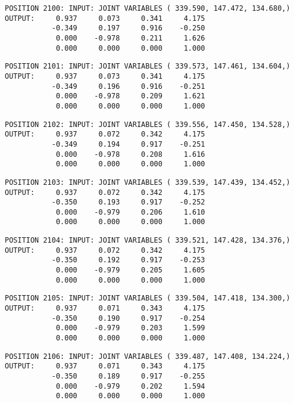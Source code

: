 \begin{verbatim}
POSITION 2100: INPUT: JOINT VARIABLES ( 339.590, 147.472, 134.680,)
OUTPUT:     0.937     0.073     0.341     4.175
           -0.349     0.197     0.916    -0.250
            0.000    -0.978     0.211     1.626
            0.000     0.000     0.000     1.000
\end{verbatim} \pagebreak[1]\begin{verbatim}
POSITION 2101: INPUT: JOINT VARIABLES ( 339.573, 147.461, 134.604,)
OUTPUT:     0.937     0.073     0.341     4.175
           -0.349     0.196     0.916    -0.251
            0.000    -0.978     0.209     1.621
            0.000     0.000     0.000     1.000
\end{verbatim} \pagebreak[1]\begin{verbatim}
POSITION 2102: INPUT: JOINT VARIABLES ( 339.556, 147.450, 134.528,)
OUTPUT:     0.937     0.072     0.342     4.175
           -0.349     0.194     0.917    -0.251
            0.000    -0.978     0.208     1.616
            0.000     0.000     0.000     1.000
\end{verbatim} \pagebreak[1]\begin{verbatim}
POSITION 2103: INPUT: JOINT VARIABLES ( 339.539, 147.439, 134.452,)
OUTPUT:     0.937     0.072     0.342     4.175
           -0.350     0.193     0.917    -0.252
            0.000    -0.979     0.206     1.610
            0.000     0.000     0.000     1.000
\end{verbatim} \pagebreak[1]\begin{verbatim}
POSITION 2104: INPUT: JOINT VARIABLES ( 339.521, 147.428, 134.376,)
OUTPUT:     0.937     0.072     0.342     4.175
           -0.350     0.192     0.917    -0.253
            0.000    -0.979     0.205     1.605
            0.000     0.000     0.000     1.000
\end{verbatim} \pagebreak[1]\begin{verbatim}
POSITION 2105: INPUT: JOINT VARIABLES ( 339.504, 147.418, 134.300,)
OUTPUT:     0.937     0.071     0.343     4.175
           -0.350     0.190     0.917    -0.254
            0.000    -0.979     0.203     1.599
            0.000     0.000     0.000     1.000
\end{verbatim} \pagebreak[1]\begin{verbatim}
POSITION 2106: INPUT: JOINT VARIABLES ( 339.487, 147.408, 134.224,)
OUTPUT:     0.937     0.071     0.343     4.175
           -0.350     0.189     0.917    -0.255
            0.000    -0.979     0.202     1.594
            0.000     0.000     0.000     1.000
\end{verbatim} \pagebreak[1]\begin{verbatim}

\end{verbatim}
